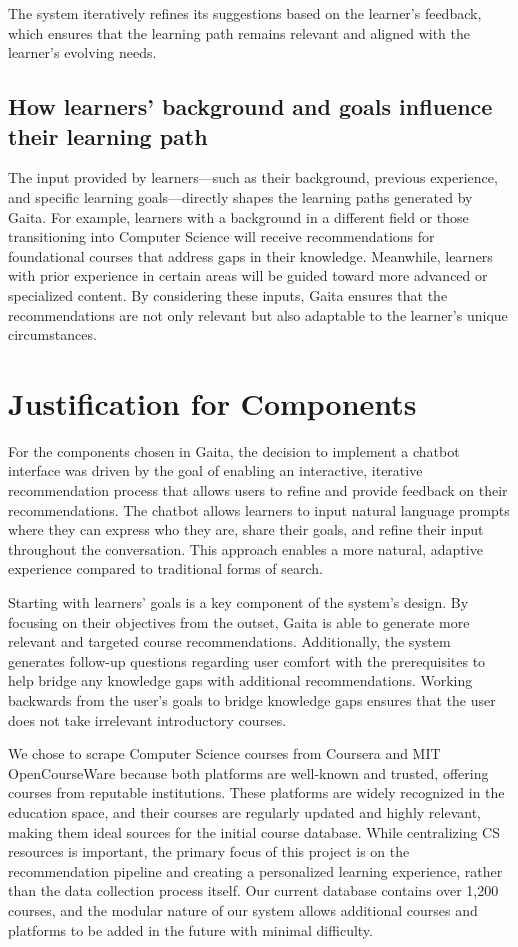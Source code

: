 The system iteratively refines its suggestions based on the learner's feedback, which ensures that the learning path remains relevant and aligned with the learner's evolving needs.

\subsection{How learners' background and goals influence their learning path}

The input provided by learners—such as their background, previous experience, and specific learning goals—directly shapes the learning paths generated by Gaita. For example, learners with a background in a different field or those transitioning into Computer Science will receive recommendations for foundational courses that address gaps in their knowledge. Meanwhile, learners with prior experience in certain areas will be guided toward more advanced or specialized content. By considering these inputs, Gaita ensures that the recommendations are not only relevant but also adaptable to the learner's unique circumstances.

\section{Justification for Components} 
For the components chosen in Gaita, the decision to implement a chatbot interface was driven by the goal of enabling an interactive, iterative recommendation process that allows users to refine and provide feedback on their recommendations. The chatbot allows learners to input natural language prompts where they can express who they are, share their goals, and refine their input throughout the conversation. This approach enables a more natural, adaptive experience compared to traditional forms of search. 

Starting with learners' goals is a key component of the system's design. By focusing on their objectives from the outset, Gaita is able to generate more relevant and targeted course recommendations. Additionally, the system generates follow-up questions regarding user comfort with the prerequisites to help bridge any knowledge gaps with additional recommendations. Working backwards from the user’s goals to bridge knowledge gaps ensures that the user does not take irrelevant introductory courses. 

We chose to scrape Computer Science courses from Coursera and MIT OpenCourseWare because both platforms are well-known and trusted, offering courses from reputable institutions. These platforms are widely recognized in the education space, and their courses are regularly updated and highly relevant, making them ideal sources for the initial course database. While centralizing CS resources is important, the primary focus of this project is on the recommendation pipeline and creating a personalized learning experience, rather than the data collection process itself. Our current database contains over 1,200 courses, and the modular nature of our system allows additional courses and platforms to be added in the future with minimal difficulty. 

